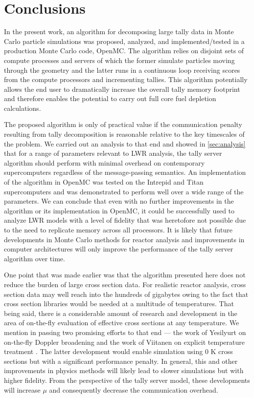 \documentclass[3p]{elsarticle}
\begin{document}
\section{Conclusions}

In the present work, an algorithm for decomposing large tally data in Monte
Carlo particle simulations was proposed, analyzed, and implemented/tested in a
production Monte Carlo code, OpenMC. The algorithm relies on disjoint sets of
compute processes and servers of which the former simulate particles moving
through the geometry and the latter runs in a continuous loop receiving scores
from the compute processors and incrementing tallies. This algorithm potentially
allows the end user to dramatically increase the overall tally memory footprint
and therefore enables the potential to carry out full core fuel depletion
calculations.

The proposed algorithm is only of practical value if the communication penalty
resulting from tally decomposition is reasonable relative to the key timescales
of the problem. We carried out an analysis to that end and showed in
\autoref{sec:analysis} that for a range of parameters relevant to LWR analysis,
the tally server algorithm should perform with minimal overhead on contemporary
supercomputers regardless of the message-passing semantics. An implementation of
the algorithm in OpenMC was tested on the Intrepid and Titan supercomputers and
was demonstrated to perform well over a wide range of the parameters. We can
conclude that even with no further improvements in the algorithm or its
implementation in OpenMC, it could be successfully used to analyze LWR models
with a level of fidelity that was heretofore not possible due to the need to
replicate memory across all processors. It is likely that future developments in
Monte Carlo methods for reactor analysis and improvements in computer
architectures will only improve the performance of the tally server algorithm
over time.

One point that was made earlier was that the algorithm presented here does not
reduce the burden of large cross section data. For realistic reactor analysis,
cross section data may well reach into the hundreds of gigabytes owing to the
fact that cross section libraries would be needed at a multitude of
temperatures. That being said, there is a considerable amount of research and
development in the area of on-the-fly evaluation of effective cross sections at
any temperature. We mention in passing two promising efforts to that end --- the
work of Yesilyurt on on-the-fly Doppler broadening \cite{nse-yesilyurt-2012} and
the work of Viitanen on explicit temperature treatment
\cite{nse-viitanen-2012}. The latter development would enable simulation using 0
K cross sections but with a significant performance penalty. In general, this
and other improvements in physics methods will likely lead to slower simulations
but with higher fidelity. From the perspective of the tally server model, these
developments will increase $\mu$ and consequently decrease the communication
overhead.
\end{document}
